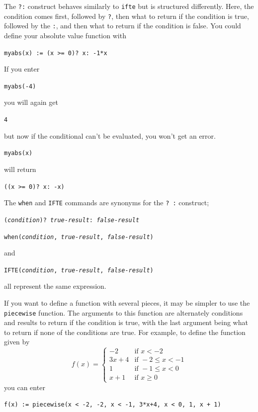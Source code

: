 \documentclass[a4paper,11pt]{book}
\begin{document}
The \texttt{?:} construct behaves similarly to \texttt{ifte} but is
structured differently.  Here, the condition comes first, followed by
\texttt{?}, then what to return if the condition is true, followed by
the \texttt{:}, and then what to return if the condition is false.
You could define your absolute value function with
\begin{center}
  {\tt myabs(x) := (x >= 0)? x: -1*x}
\end{center}
If you enter
\begin{center}
  {\tt myabs(-4)}
\end{center}
you will again get
\begin{center}
  {\tt 4}
\end{center}
but now if the conditional can't be evaluated, you won't get an error.
\begin{center}
  {\tt myabs(x)}
\end{center}
will return
\begin{center}
  {\tt ((x >= 0)? x: -x)}
\end{center}

The \texttt{when} and \texttt{IFTE} commands
are synonyms for the \texttt{? :} construct; 
\begin{center}
  {\tt (\textit{condition})? \textit{true-result}: \textit{false-result}}
\end{center}
\begin{center}
  {\tt when(\textit{condition}, \textit{true-result}, \textit{false-result})}
\end{center}
and
\begin{center}
  {\tt IFTE(\textit{condition}, \textit{true-result}, \textit{false-result})}
\end{center}
all represent the same expression.

If you want to define a function with several pieces, it may be
simpler to use the \texttt{piecewise} function.  The
arguments to this function are alternately conditions and results to
return if the condition is true, with the last argument being what to
return if none of the conditions are true.  For example, to define the
function given by
\[
f(x) = 
\begin{cases}
-2 & \text{if } x < -2\\
3x+4 & \text{if } -2 \le x < -1\\
1 & \text{if } -1 \le x < 0\\
x + 1 & \text{if } x \ge 0
\end{cases}
\]
you can enter
\begin{center}
  {\tt f(x) := piecewise(x < -2, -2, x < -1, 3*x+4, x < 0, 1, x + 1)}
\end{center}
\end{document}

